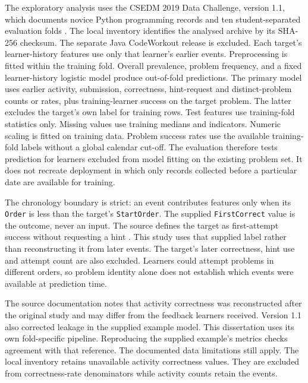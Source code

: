 The exploratory analysis uses the CSEDM 2019 Data Challenge, version 1.1, which documents novice Python programming records and ten student-separated
evaluation folds \parencite{csedm2019challenge}. The local inventory identifies the analysed archive by its SHA-256 checksum.
The separate Java CodeWorkout release is excluded. Each target's learner-history features use only that learner's earlier events. Preprocessing is fitted within
the training fold. Overall prevalence, problem frequency, and a fixed learner-history logistic model produce out-of-fold
predictions. The primary model uses earlier activity, submission, correctness, hint-request and distinct-problem counts or rates,
plus training-learner success on the target problem. The latter excludes the target's own label for training rows. Test features
use training-fold statistics only. Missing values use training medians and indicators. Numeric scaling is fitted on training data.
Problem success rates use the available training-fold labels without a global calendar cut-off. The evaluation therefore
tests prediction for learners excluded from model fitting on the existing problem set. It does not recreate deployment in
which only records collected before a particular date are available for training.

The chronology boundary is strict: an event contributes features only when its \texttt{Order} is less than the target's
\texttt{StartOrder}. The supplied \texttt{FirstCorrect} value is the outcome, never an input. The source defines the target
as first-attempt success without requesting a hint \parencite[The Data, Predict.csv]{csedm2019challenge}. This study uses
that supplied label rather than reconstructing it from later events. The target's later correctness,
hint use and attempt count are also excluded. Learners could attempt problems in different orders, so problem identity alone
does not establish which events were available at prediction time.

The source documentation notes that activity correctness was reconstructed after the original study and may differ from the
feedback learners received. Version 1.1 also corrected leakage in the supplied example model. This dissertation uses its own
fold-specific pipeline. Reproducing the supplied example's metrics checks agreement with that reference. The documented data
limitations still apply. The local inventory retains unavailable activity correctness values. They are excluded from
correctness-rate denominators while activity counts retain the events.

